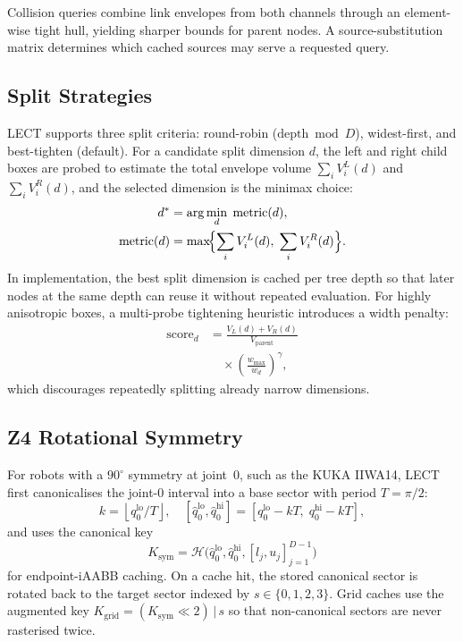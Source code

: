 \documentclass[journal]{IEEEtran}
\begin{document}
Collision queries combine link envelopes from both channels through an
element-wise tight hull, yielding sharper bounds for parent nodes. A
source-substitution matrix determines which cached sources may serve a
requested query.

\subsection{Split Strategies}

LECT supports three split criteria: round-robin
($\mathrm{depth} \bmod D$), widest-first, and best-tighten (default).
For a candidate split dimension $d$, the left and right child boxes are
probed to estimate the total envelope volume
$\sum_i V_i^L(d)$ and $\sum_i V_i^R(d)$, and the selected dimension is
the minimax choice:
\begin{equation}
  \begin{aligned}
    d^* &= \arg\min_d\; \mathrm{metric}(d), \\
    \mathrm{metric}(d)
      &= \max\!\Bigl\{\sum_i V_i^L(d),\; \sum_i V_i^R(d)\Bigr\}.
  \end{aligned}
\end{equation}
In implementation, the best split dimension is cached per tree depth so
that later nodes at the same depth can reuse it without repeated
evaluation. For highly anisotropic boxes, a multi-probe tightening
heuristic introduces a width penalty:
\begin{equation}
  \begin{aligned}
    \mathrm{score}_d
    &= \frac{V_L(d)+V_R(d)}{V_{\mathrm{parent}}} \\
    &\quad \times \left(\frac{w_{\max}}{w_d}\right)^{\gamma},
  \end{aligned}
\end{equation}
which discourages repeatedly splitting already narrow dimensions.

\subsection{Z4 Rotational Symmetry}

For robots with a $90^\circ$ symmetry at joint~0, such as the KUKA
IIWA14, LECT first canonicalises the joint-0 interval into a base sector
with period $T = \pi/2$:
\begin{equation}
  k = \left\lfloor q_0^{\mathrm{lo}}/T \right\rfloor,\quad
  [\hat q_0^{\mathrm{lo}},\hat q_0^{\mathrm{hi}}] =
  [q_0^{\mathrm{lo}}-kT,\;q_0^{\mathrm{hi}}-kT],
\end{equation}
and uses the canonical key
\begin{equation}
  K_{\mathrm{sym}} = \mathcal{H}\bigl(\hat q_0^{\mathrm{lo}},\hat q_0^{\mathrm{hi}},
  [l_j,u_j]_{j=1}^{D-1}\bigr)
\end{equation}
for endpoint-iAABB caching. On a cache hit, the stored canonical sector
is rotated back to the target sector indexed by $s \in \{0,1,2,3\}$.
Grid caches use the augmented key
$K_{\mathrm{grid}} = (K_{\mathrm{sym}} \ll 2)\,|\,s$ so that
non-canonical sectors are never rasterised twice.
\end{document}
